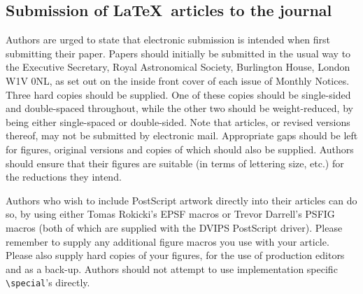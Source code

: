 \subsection{Submission of \LaTeX\ articles to the journal}

Authors are urged to state that electronic submission is intended when
first submitting their paper.
Papers should initially be submitted in the usual way to the Executive
Secretary, Royal Astronomical Society, Burlington House, London W1V 0NL,
as set out on the inside front cover of
each issue of Monthly Notices. Three hard copies should be supplied.
One of these copies should
be single-sided and double-spaced throughout, while the other two should
be weight-reduced, by being either single-spaced or double-sided. Note
that articles, or revised versions thereof, may not be submitted by
electronic mail. Appropriate gaps should be left for figures, original
versions and copies of which should also be supplied. Authors should
ensure that their figures are suitable (in terms of lettering size, etc.)
for the reductions they intend.

Authors who wish to include PostScript artwork dir\-ectly into their
articles can do so, by using either Tomas Rokicki's {\sf EPSF} macros
or Trevor Darrell's {\sf PSFIG} macros (both of which are supplied with
the DVIPS PostScript driver). Please remember to supply any additional
figure macros you use with your article.
Please also supply hard copies of your figures, for the use of production
editors and as a back-up.
Authors should not attempt to
use implementation specific \verb"\special"'s directly.

